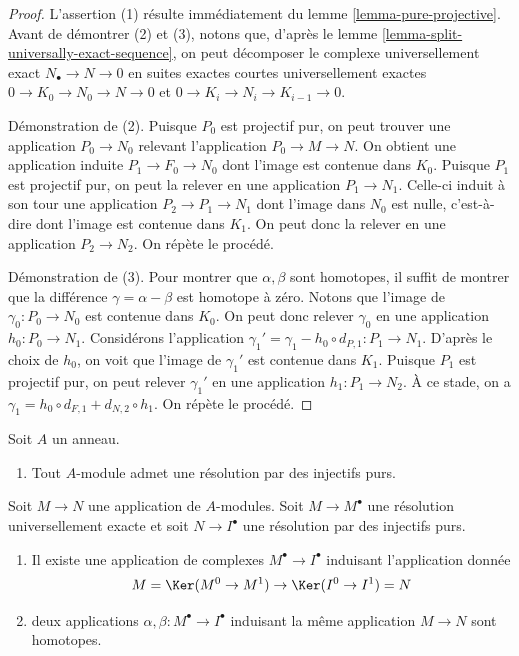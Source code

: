 \begin{proof}
L'assertion (1) résulte immédiatement du
lemme \ref{lemma-pure-projective}.
Avant de démontrer (2) et (3), notons que, d'après le
lemme \ref{lemma-split-universally-exact-sequence},
on peut décomposer le complexe universellement exact $N_\bullet \to N \to 0$
en suites exactes courtes universellement exactes $0 \to K_0 \to N_0 \to N \to 0$
et $0 \to K_i \to N_i \to K_{i - 1} \to 0$.

\medskip\noindent
Démonstration de (2). Puisque $P_0$ est projectif pur,
on peut trouver une application $P_0 \to N_0$ relevant l'application $P_0 \to M \to N$.
On obtient une application induite $P_1 \to F_0 \to N_0$ dont l'image est contenue dans $K_0$.
Puisque $P_1$ est projectif pur, on peut la relever
en une application $P_1 \to N_1$. Celle-ci induit à son tour une application
$P_2 \to P_1 \to N_1$ dont l'image dans
$N_0$ est nulle, c'est-à-dire dont l'image est contenue dans $K_1$. On peut donc la relever en une application
$P_2 \to N_2$. On répète le procédé.

\medskip\noindent
Démonstration de (3). Pour montrer que $\alpha, \beta$ sont homotopes, il suffit
de montrer que la différence $\gamma = \alpha - \beta$ est homotope
à zéro. Notons que l'image de $\gamma_0 : P_0 \to N_0$
est contenue dans $K_0$. On peut donc relever
$\gamma_0$ en une application $h_0 : P_0 \to N_1$. Considérons l'application
$\gamma_1' = \gamma_1 - h_0 \circ d_{P, 1} : P_1 \to N_1$.
D'après le choix de $h_0$, on voit que l'image de $\gamma_1'$
est contenue dans $K_1$. Puisque $P_1$ est projectif pur, on peut relever
$\gamma_1'$ en une application $h_1 : P_1 \to N_2$. À ce stade, on a
$\gamma_1 = h_0 \circ d_{F, 1} + d_{N, 2} \circ h_1$. On répète le procédé.
\end{proof}

\begin{lemma}
\label{lemma-pure-injective-resolutions}
Soit $A$ un anneau.
\begin{enumerate}
\item Tout $A$-module admet une résolution par des injectifs purs.
\end{enumerate}
Soit $M \to N$ une application de $A$-modules.
Soit $M \to M^\bullet$ une résolution universellement exacte et
soit $N \to I^\bullet$ une résolution par des injectifs purs.
\begin{enumerate}
\item[(2)] Il existe une application de complexes $M^\bullet \to I^\bullet$
induisant l'application donnée
$$
M = \Ker(M^0 \to M^1) \to \Ker(I^0 \to I^1) = N
$$
\item[(3)] deux applications $\alpha, \beta : M^\bullet \to I^\bullet$
induisant la même application $M \to N$ sont homotopes.
\end{enumerate}
\end{lemma}

